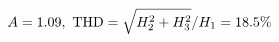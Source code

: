 \documentclass[preview]{standalone}
\begin{document}
\begin{align*}
\special{dvisvgm:raw <g id='unique000'>}A=1.09,\ \text{THD}=\sqrt{H_2^2+H_3^2}/H_1=18.5\%\special{dvisvgm:raw </g>}
\end{align*}
\end{document}

